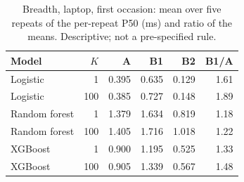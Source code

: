 \documentclass[10pt,a4paper]{article}
\begin{document}
\begin{table}[h]
\centering\small
\caption{Breadth, laptop, first occasion: mean over five repeats of the per-repeat P50 (ms) and ratio of the means. Descriptive; not a pre-specified rule.}\label{tab:lap_p50}
\begin{tabular}{lrrrrr}
\toprule
Model & $K$ & A & B1 & B2 & B1/A \\
\midrule
Logistic & 1 & 0.395 & 0.635 & 0.129 & 1.61 \\
Logistic & 100 & 0.385 & 0.727 & 0.148 & 1.89 \\
Random forest & 1 & 1.379 & 1.634 & 0.819 & 1.18 \\
Random forest & 100 & 1.405 & 1.716 & 1.018 & 1.22 \\
XGBoost & 1 & 0.900 & 1.195 & 0.525 & 1.33 \\
XGBoost & 100 & 0.905 & 1.339 & 0.567 & 1.48 \\
\bottomrule
\end{tabular}
\end{table}
\end{document}
